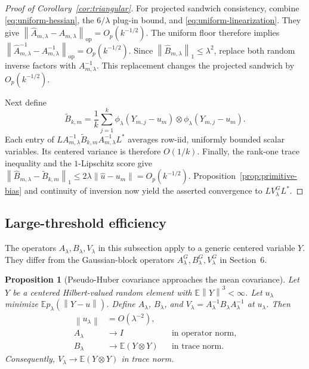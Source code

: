 \documentclass[twoside]{article}
\newtheorem{proposition}[theorem]{Proposition}
\theoremstyle{definition}
\newcommand{\E}{\mathbb E}
\newcommand{\norm}[1]{\left\lVert #1\right\rVert}
\newcommand{\op}{\mathrm{op}}
\begin{document}
\begin{proof}[Proof of Corollary~\ref{cor:triangular}]
For projected sandwich consistency, combine \eqref{eq:uniform-hessian}, the $6/\lambda$ plug-in bound, and \eqref{eq:uniform-linearization}. They give $\norm{\hat A_{m,\lambda}-A_{m,\lambda}}_{\op}=O_p(k^{-1/2})$. The uniform floor therefore implies
$\norm{\hat A_{m,\lambda}^{-1}-A_{m,\lambda}^{-1}}_{\op}=O_p(k^{-1/2})$.
Since $\norm{\hat B_{m,\lambda}}_1\le\lambda^2$, replace both random inverse factors with $A_{m,\lambda}^{-1}$. This replacement changes the projected sandwich by $O_p(k^{-1/2})$.

Next define
\[
    \widetilde B_{k,m}
    =\frac1k\sum_{j=1}^k
      \phi_\lambda(Y_{m,j}-u_m)\otimes
      \phi_\lambda(Y_{m,j}-u_m).
\]
Each entry of $L A_{m,\lambda}^{-1}\widetilde B_{k,m}A_{m,\lambda}^{-1}L^*$ averages row-iid, uniformly bounded scalar variables. Its centered variance is therefore $O(1/k)$. Finally, the rank-one trace inequality and the $1$-Lipschitz score give
$\norm{\hat B_{m,\lambda}-\widetilde B_{k,m}}_1
\le2\lambda\norm{\hat u-u_m}=O_p(k^{-1/2})$.
Proposition~\ref{prop:primitive-bias} and continuity of inversion now yield the asserted convergence to $L V_\lambda^G L^*$.
\end{proof}

\subsection{Large-threshold efficiency}\label{app:large-threshold}

The operators $A_\lambda,B_\lambda,V_\lambda$ in this subsection apply to a generic centered variable $Y$. They differ from the Gaussian-block operators $A_\lambda^G,B_\lambda^G,V_\lambda^G$ in Section~6.

\begin{proposition}[Pseudo-Huber covariance approaches the mean covariance]\label{prop:large-threshold}
Let $Y$ be a centered Hilbert-valued random element with $\E\norm Y^3<\infty$. Let $u_\lambda$ minimize $\E p_\lambda(\norm{Y-u})$. Define $A_\lambda$, $B_\lambda$, and $V_\lambda=A_\lambda^{-1}B_\lambda A_\lambda^{-1}$ at $u_\lambda$. Then
\begin{align*}
    \norm{u_\lambda}&=O(\lambda^{-2}),\\
    A_\lambda&\to I
    &&\text{in operator norm},\\
    B_\lambda&\to\E(Y\otimes Y)
    &&\text{in trace norm}.
\end{align*}
Consequently, $V_\lambda\to\E(Y\otimes Y)$ in trace norm.
\end{proposition}
\end{document}
